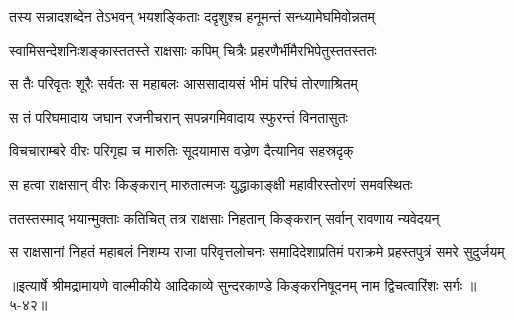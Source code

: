 \twolineshloka
{तस्य सन्नादशब्देन तेऽभवन् भयशङ्किताः}
{ददृशुश्च हनूमन्तं सन्ध्यामेघमिवोन्नतम्} %

\twolineshloka
{स्वामिसन्देशनिःशङ्कास्ततस्ते राक्षसाः कपिम्}
{चित्रैः प्रहरणैर्भीमैरभिपेतुस्ततस्ततः} %

\twolineshloka
{स तैः परिवृतः शूरैः सर्वतः स महाबलः}
{आससादायसं भीमं परिघं तोरणाश्रितम्} %

\twolineshloka
{स तं परिघमादाय जघान रजनीचरान्}
{सपन्नगमिवादाय स्फुरन्तं विनतासुतः} %

\twolineshloka
{विचचाराम्बरे वीरः परिगृह्य च मारुतिः}
{सूदयामास वज्रेण दैत्यानिव सहस्रदृक्} %

\twolineshloka
{स हत्वा राक्षसान् वीरः किङ्करान् मारुतात्मजः}
{युद्धाकाङ्क्षी महावीरस्तोरणं समवस्थितः} %

\twolineshloka
{ततस्तस्माद् भयान्मुक्ताः कतिचित् तत्र राक्षसाः}
{निहतान् किङ्करान् सर्वान् रावणाय न्यवेदयन्} %

\twolineshloka
{स राक्षसानां निहतं महाबलं निशम्य राजा परिवृत्तलोचनः}
{समादिदेशाप्रतिमं पराक्रमे प्रहस्तपुत्रं समरे सुदुर्जयम्} %


॥इत्यार्षे श्रीमद्रामायणे वाल्मीकीये आदिकाव्ये सुन्दरकाण्डे किङ्करनिषूदनम् नाम द्विचत्वारिंशः सर्गः ॥५-४२॥
